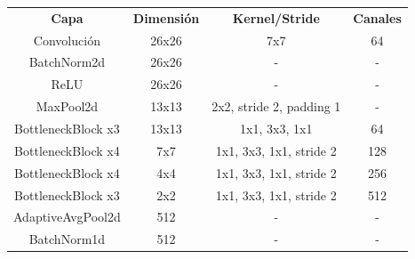 \begin{table}[]
\begin{tabular}{|c|c|c|c|}
\hline
\multirow{2}{*}{\textbf{Capa}} & \multirow{2}{*}{\textbf{Dimensión}} & \multirow{2}{*}{\textbf{Kernel/Stride}} & \multirow{2}{*}{\textbf{Canales}} \\
                               &                                            &                                         &                                          \\ \hline
Convolución                    & 26x26                                      & 7x7                                     & 64                                       \\ \hline
BatchNorm2d                    & 26x26                                      & -                                       & -                                        \\ \hline
ReLU                           & 26x26                                      & -                                       & -                                        \\ \hline
MaxPool2d                      & 13x13                                      & 2x2, stride 2, padding 1                & -                                        \\ \hline
BottleneckBlock x3             & 13x13                                      & 1x1, 3x3, 1x1                           & 64                                       \\ \hline
BottleneckBlock x4             & 7x7                                        & 1x1, 3x3, 1x1, stride 2                 & 128                                      \\ \hline
BottleneckBlock x4             & 4x4                                        & 1x1, 3x3, 1x1, stride 2                 & 256                                      \\ \hline
BottleneckBlock x3             & 2x2                                        & 1x1, 3x3, 1x1, stride 2                 & 512                                      \\ \hline
AdaptiveAvgPool2d              & 512                                        & -                                       & -                                        \\ \hline
BatchNorm1d                    & 512                                        & -                                       & -                                        \\ \hline

\end{tabular}
\end{table}
